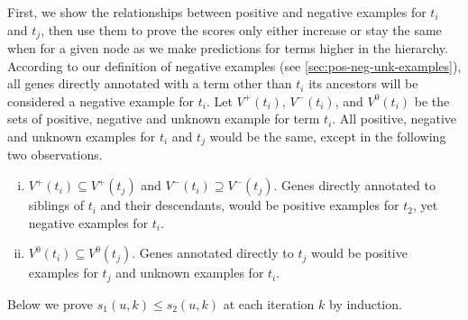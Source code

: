 First, we show the relationships between positive and negative examples for $t_i$ and $t_j$, then use them to prove the scores only either increase or stay the same when for a given node as we make predictions for terms higher in the hierarchy. 
According to our definition of negative examples (see \cref{sec:pos-neg-unk-examples}), all genes directly annotated with a term other than $t_i$ its ancestors will be considered a negative example for $t_i$. 
Let $V^+(t_i)$, $V^-(t_i)$, and $V^0(t_i)$ be the sets of positive, negative and unknown example for term $t_i$.  %
All positive, negative and unknown examples for $t_i$ and $t_j$ would be the same, except in the following two observations.
\begin{enumerate}[i.]
    \item $V^+(t_i) \subseteq V^+(t_j)$ and $V^-(t_i) \supseteq V^-(t_j)$. Genes directly annotated to siblings of $t_i$ and their descendants, would be positive examples for $t_2$, yet negative examples for $t_i$.
    \item $V^0(t_i) \subseteq V^0(t_j)$. Genes annotated directly to $t_j$ would be positive examples for $t_j$ and unknown examples for $t_i$.
\end{enumerate}
Below we prove $s_1(u,k) \leq s_2(u,k)$ at each iteration $k$ by induction.

